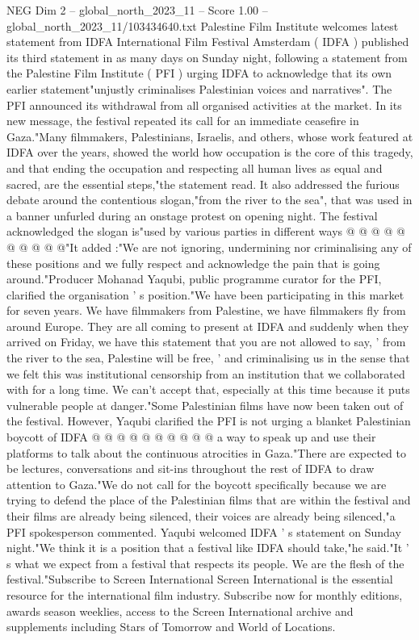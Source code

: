 \begin{textsample}{NEG Dim 2 – global\_north\_2023\_11 – Score 1.00 – global\_north\_2023\_11/103434640.txt}  \label{ex:f2_neg_215}
Palestine Film Institute welcomes latest statement from IDFA International Film Festival Amsterdam ( IDFA ) published its third statement in as many days on Sunday night, following a statement from the Palestine Film Institute ( PFI ) urging IDFA to acknowledge that its own earlier statement"unjustly criminalises Palestinian voices and narratives".
The PFI announced its withdrawal from all organised activities at the market.
In its new message, the festival repeated its call for an immediate ceasefire in Gaza."Many filmmakers, Palestinians, Israelis, and others, whose work featured at IDFA over the years, showed the world how occupation is the core of this tragedy, and that ending the occupation and respecting all human lives as equal and sacred, are the essential steps,"the statement read.
It also addressed the furious debate around the contentious slogan,"from the river to the sea", that was used in a banner unfurled during an onstage protest on opening night.
The festival acknowledged the slogan is"used by various parties in different ways @ @ @ @ @ @ @ @ @ @"It added :"We are not ignoring, undermining nor criminalising any of these positions and we fully respect and acknowledge the pain that is going around."Producer Mohanad Yaqubi, public programme curator for the PFI, clarified the organisation ' s position."We have been participating in this market for seven years.
We have filmmakers from Palestine, we have filmmakers fly from around Europe.
They are all coming to present at IDFA and suddenly when they arrived on Friday, we have this statement that you are not allowed to say, ' from the river to the sea, Palestine will be free, ' and criminalising us in the sense that we felt this was institutional censorship from an institution that we collaborated with for a long time.
We can't accept that, especially at this time because it puts vulnerable people at danger."Some Palestinian films have now been taken out of the festival.
However, Yaqubi clarified the PFI is not urging a blanket Palestinian boycott of IDFA @ @ @ @ @ @ @ @ @ @ a way to speak up and use their platforms to talk about the continuous atrocities in Gaza."There are expected to be lectures, conversations and sit-ins throughout the rest of IDFA to draw attention to Gaza."We do not call for the boycott specifically because we are trying to defend the place of the Palestinian films that are within the festival and their films are already being silenced, their voices are already being silenced,"a PFI spokesperson commented.
Yaqubi welcomed IDFA ' s statement on Sunday night."We think it is a position that a festival like IDFA should take,"he said."It ' s what we expect from a festival that respects its people.
We are the flesh of the festival."Subscribe to Screen International Screen International is the essential resource for the international film industry.
Subscribe now for monthly editions, awards season weeklies, access to the Screen International archive and supplements including Stars of Tomorrow and World of Locations.

\end{textsample}
